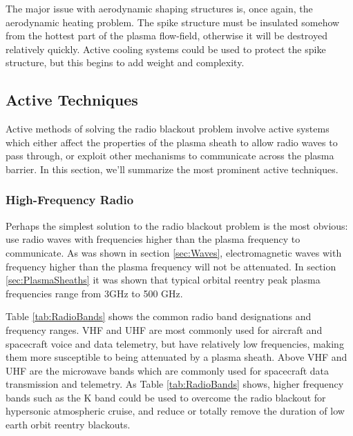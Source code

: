 \documentclass[twocolumn]{article}
\begin{document}
			The major issue with aerodynamic shaping structures is, once again, the aerodynamic heating problem.
			The spike structure must be insulated somehow from the hottest part of the plasma flow-field, otherwise it will be destroyed relatively quickly.\cite{hartunian_implications_2007}
			Active cooling systems could be used to protect the spike structure, but this begins to add weight and complexity.
			
	\subsection*{Active Techniques}
		Active methods of solving the radio blackout problem involve active systems which either affect the properties of the plasma sheath to allow radio waves to pass through, or exploit other mechanisms to communicate across the plasma barrier.
		In this section, we'll summarize the most prominent active techniques.
	
		\subsubsection*{High-Frequency Radio}
			Perhaps the simplest solution to the radio blackout problem is the most obvious: use radio waves with frequencies higher than the plasma frequency to communicate.
			As was shown in section \ref{sec:Waves}, electromagnetic waves with frequency higher than the plasma frequency will not be attenuated.
			In section \ref{sec:PlasmaSheaths} it was shown that typical orbital reentry peak plasma frequencies range from 3GHz to 500 GHz.
			
			Table \ref{tab:RadioBands} shows the common radio band designations and frequency ranges.
			VHF and UHF are most commonly used for aircraft and spacecraft voice and data telemetry, but have relatively low frequencies, making them more susceptible to being attenuated by a plasma sheath.
			Above VHF and UHF are the microwave bands which are commonly used for spacecraft data transmission and telemetry.
			As Table \ref{tab:RadioBands} shows, higher frequency bands such as the K band could be used to overcome the radio blackout for hypersonic atmospheric cruise, and reduce or totally remove the duration of low earth orbit reentry blackouts.
			
\end{document}
